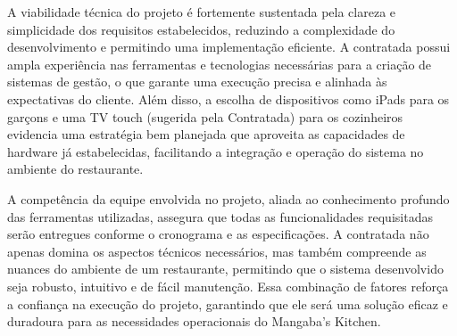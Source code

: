 \par
A viabilidade técnica do projeto é fortemente sustentada pela clareza e simplicidade dos requisitos estabelecidos, reduzindo a complexidade do desenvolvimento e permitindo uma implementação eficiente. A contratada possui ampla experiência nas ferramentas e tecnologias necessárias para a criação de sistemas de gestão, o que garante uma execução precisa e alinhada às expectativas do cliente. Além disso, a escolha de dispositivos como iPads para os garçons e uma TV touch (sugerida pela Contratada) para os cozinheiros evidencia uma estratégia bem planejada que aproveita as capacidades de hardware já estabelecidas, facilitando a integração e operação do sistema no ambiente do restaurante.
\par
A competência da equipe envolvida no projeto, aliada ao conhecimento profundo das ferramentas utilizadas, assegura que todas as funcionalidades requisitadas serão entregues conforme o cronograma e as especificações. A contratada não apenas domina os aspectos técnicos necessários, mas também compreende as nuances do ambiente de um restaurante, permitindo que o sistema desenvolvido seja robusto, intuitivo e de fácil manutenção. Essa combinação de fatores reforça a confiança na execução do projeto, garantindo que ele será uma solução eficaz e duradoura para as necessidades operacionais do Mangaba's Kitchen.